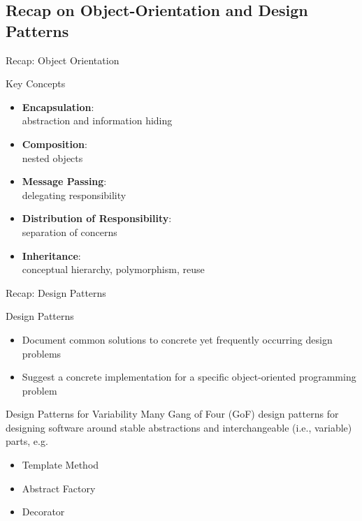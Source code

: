 
\subsection{Recap on Object-Orientation and Design Patterns}

\begin{frame}{Recap: Object Orientation}
	\begin{mycolumns}[height=50mm]
		\begin{definition}{Key Concepts}
			\begin{itemize}
				\item \textbf{Encapsulation}:\\abstraction and information hiding
				\item \textbf{Composition}:\\nested objects
				\item \textbf{Message Passing}:\\delegating responsibility
				\item \textbf{Distribution of Responsibility}:\\separation of concerns
				\item \textbf{Inheritance}:\\conceptual hierarchy, polymorphism, reuse
			\end{itemize}
		\end{definition}
	\mynextcolumn
	\end{mycolumns}
\end{frame}

\begin{frame}{Recap: Design Patterns\ \mytitlesource{\gof}}
	\begin{mycolumns}[widths={60}]
		\begin{definition}{Design Patterns }
			\begin{itemize}
				\item Document common solutions to concrete yet frequently occurring design problems
				\item Suggest a concrete implementation for a specific object-oriented programming problem
			\end{itemize}
		\end{definition}	
		\begin{note}{Design Patterns for Variability}
			Many Gang of Four (GoF) design patterns for designing software around stable abstractions and interchangeable (i.e., variable) parts, e.g.
			\begin{itemize}
				\item Template Method
				\item Abstract Factory
				\item Decorator
			\end{itemize}
		\end{note}
	\mynextcolumn
	\end{mycolumns}
\end{frame}

